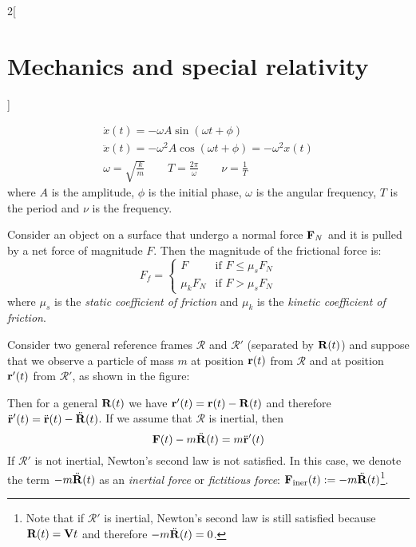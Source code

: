 \documentclass[../../../main_physics.tex]{subfiles}
\begin{document}
\begin{multicols}{2}[\section{Mechanics and special relativity}]
\begin{proposition}
\begin{gather*}
      \dot{x}(t)=-\omega A\sin(\omega t+\phi)\\
      \ddot{x}(t)=-\omega^2 A\cos(\omega t+\phi)=-\omega^2x(t)\\
      \omega=\sqrt{\frac{k}{m}}\qquad T=\frac{2\pi}{\omega}\qquad\nu=\frac{1}{T}
    \end{gather*}
    where $A$ is the amplitude, $\phi$ is the initial phase, $\omega$ is the angular frequency, $T$ is the period and $\nu$ is the frequency.
  \end{proposition}
  \begin{proposition}
    Consider an object on a surface that undergo a normal force $\boldsymbol{\mathrm{F}}_N$ and it is pulled by a net force of magnitude $F$. Then the magnitude of the frictional force is:
    $$
      F_f=
      \begin{cases}
        F        & \text{if }F\leq\mu_sF_N \\
        \mu_kF_N & \text{if }F>\mu_sF_N
      \end{cases}
    $$
    where $\mu_s$ is the \emph{static coefficient of friction} and $\mu_k$ is the \emph{kinetic coefficient of friction}.
  \end{proposition}
  \begin{proposition}
    Consider two general reference frames $\mathcal{R}$ and $\mathcal{R}'$ (separated by $\boldsymbol{\mathrm{R}}(t)$) and suppose that we observe a particle of mass $m$ at position $\boldsymbol{\mathrm{r}}(t)$ from $\mathcal{R}$ and at position $\boldsymbol{\mathrm{r}}'(t)$ from $\mathcal{R}'$, as shown in the figure:
    \begin{center}
      \begin{minipage}{\linewidth}
        \centering
        
      \end{minipage}
    \end{center}
    Then for a general $\boldsymbol{\mathrm{R}}(t)$ we have $\boldsymbol{\mathrm{r}}'(t)=\boldsymbol{\mathrm{r}}(t)-\boldsymbol{\mathrm{R}}(t)$ and therefore $\ddot{\boldsymbol{\mathrm{r}}}'(t)=\ddot{\boldsymbol{\mathrm{r}}}(t)-\ddot{\boldsymbol{\mathrm{R}}}(t)$. If we assume that $\mathcal{R}$ is inertial, then $$\boldsymbol{\mathrm{F}}(t)-m\ddot{\boldsymbol{\mathrm{R}}}(t)=m\ddot{\boldsymbol{\mathrm{r}}}'(t)$$ If $\mathcal{R}'$ is not inertial, Newton's second law is not satisfied. In this case, we denote the term $-m\ddot{\boldsymbol{\mathrm{R}}}(t)$ as an \emph{inertial force} or \emph{fictitious force}: $\boldsymbol{\mathrm{F}}_\text{iner}(t):=-m\ddot{\boldsymbol{\mathrm{R}}}(t)$\footnote{Note that if $\mathcal{R}'$ is inertial, Newton's second law is still satisfied because $\boldsymbol{\mathrm{R}}(t)=\boldsymbol{\mathrm{V}}t$ and therefore $-m\ddot{\boldsymbol{\mathrm{R}}}(t)=0$.}.
  \end{proposition}

\end{multicols}
\end{document}
